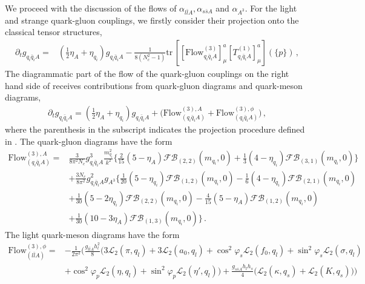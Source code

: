 \documentclass[reprint,twocolumn,superscriptaddress,preprintnumbers,amsmath,amssymb,aps,prd,floatfix]{revtex4-2}
\newcommand{\tr}{{\text{tr}}}
\begin{document}
We proceed with the discussion of the flows of $\alpha_{l\bar l A},\alpha_{s\bar s A}$ and $\alpha_{A^3}$. For the light and strange quark-gluon couplings, we firstly consider their projection onto the classical tensor structures, 
%
\begin{align}
	\partial_t g_{q_i {\bar q}_i  A }=
	&\left( \frac12\eta_A+\eta_{q_i}\right) g_{q_i {\bar q}_i A }
	-\frac{1}{8(N_c^2-1)}\tr\,\left[\left[
	{{\textrm{Flow}}}^{(3)}_{ q_i\bar{q}_i A}\right]^{a}_{\mu}
	\left[ T^{{(1)}}_{ q_i{\bar q}_i  A}\right]^a_{\mu}\right](\{p\})\,,
\label{eq:dtg_q}
\end{align}
%
The diagrammatic part of the flow of the quark-gluon couplings on the right hand side of  receives contributions from quark-gluon diagrams and quark-meson diagrams,
%
\begin{align} \partial_t g_{q_i {\bar q}_i A }
	= \left( \frac12\eta_A+\eta_{q_i}\right)
	g_{q_i {\bar q}_i A }+\bigg({\textrm{Flow}}^{(3),A}_{(q_i {\bar q}_i  A
		)} + {\textrm{Flow}}^{(3),\phi}_{{(q_i {\bar q}_i  A
			)}}\bigg)\,, 
\end{align}
%
where the parenthesis in the subscript indicates the projection procedure defined in 
. The quark-gluon diagrams have the form 
%
\begin{align}
	{\textrm{Flow}}^{(3),A}_{({q_i {\bar q}_i A })}
	=&\frac{3}{8\pi^2N_c}
	g_{q_i {\bar q}_i A }^{3}\frac{{m}_{q_i}^{2}}{k^2}\bigg
	\{\frac{2}{15}(5-\eta_{A})\mathcal{FB}_{(2,2)}(
	m_{q_i},0)+\frac{1}{3}(4-\eta_{q_i})\mathcal{FB}_{(3,1)}(
	m_{q_i},0)\bigg\}\nonumber \\[1ex]
	&+\frac{3N_c}{8\pi^2}g_{q_i {\bar q}_i A }^{2}g_{A^3}
	\bigg\{\frac{1}{20} (5-\eta_{q_i})
	\mathcal{FB}_{(1,2)}(m_{q_i},0) -\frac{1}{6} (4-\eta_{q_i})\mathcal{FB}_{(2,1)}(m_{q_i},0)\nonumber \\[1ex]
	&  +\frac{1}{30} (5-2\eta_{q_i}) \mathcal{FB}_{(2,2)}(m_{q_i},0)
	-\frac{4}{15}(5-\eta_{A})\mathcal{FB}_{(1,2)}(m_{q_i},0)\nonumber \\[1ex]
	&  +\frac{1}{30}(10-3\eta_{A}) \mathcal{FB}_{(1,3)}(m_{q_i},0)\bigg\} \,.
\end{align}
%
The light quark-meson diagrams have the form 
%
\begin{align}
	{\textrm{Flow}}^{(3),\phi}_{{({l \bar{l}A })}}
	=& -\frac{1}{2\pi^2}\bigg(\frac{g_{l \bar{l}A } {h}_{l}^{2}}{8}\bigg(3\mathcal{L}_2(\pi,q_l)+3\mathcal{L}_2(a_0,q_l)   
	+\cos^2 \varphi_s\mathcal{L}_2(f_0,q_l) +\sin^2 \varphi_s\mathcal{L}_2(\sigma,q_l)
	\nonumber \\[1ex]
	&+\cos^2 \varphi_p \mathcal{L}_2(\eta,q_l)+\sin^2 \varphi_p \mathcal{L}_2(\eta ',q_l)\bigg)
	+\frac{ g_{s \bar{s}A } {h}_{l}{h}_{s}}{4}\bigg(\mathcal{L}_2(\kappa,q_s)+\mathcal{L}_2(K,q_s)\bigg)\bigg)
\end{align}
\end{document}
